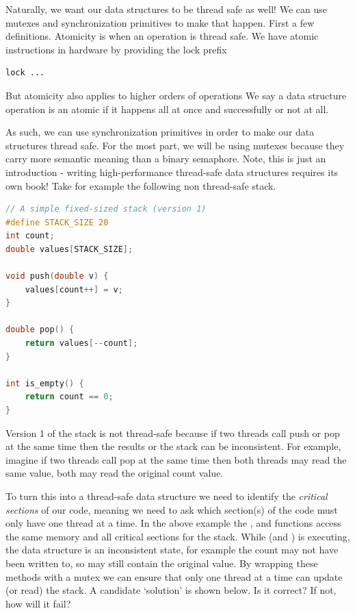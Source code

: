 Naturally, we want our data structures to be thread safe as well!
We can use mutexes and synchronization primitives to make that happen.
First a few definitions.
Atomicity is when an operation is thread safe.
We have atomic instructions in hardware by providing the lock prefix
\begin{lstlisting}
lock ...
\end{lstlisting}
But atomicity also applies to higher orders of operations
We say a data structure operation is an atomic if it happens all at once and successfully or not at all.

As such, we can use synchronization primitives in order to make our data structures thread safe.
For the most part, we will be using mutexes because they carry more semantic meaning than a binary semaphore.
Note, this is just an introduction - writing high-performance thread-safe data structures requires its own book!
Take for example the following non thread-safe stack.

\begin{lstlisting}[language=C]
// A simple fixed-sized stack (version 1)
#define STACK_SIZE 20
int count;
double values[STACK_SIZE];

void push(double v) {
    values[count++] = v;
}

double pop() {
    return values[--count];
}

int is_empty() {
    return count == 0;
}
\end{lstlisting}

Version 1 of the stack is not thread-safe because if two threads call push or pop at the same time then the results or the stack can be inconsistent.
For example, imagine if two threads call pop at the same time then both threads may read the same value, both may read the original count value.

To turn this into a thread-safe data structure we need to identify the \emph{critical sections} of our code, meaning we need to ask which section(s) of the code must only have one thread at a time.
In the above example the , and  functions access the same memory and all critical sections for the stack.
While  (and ) is executing, the data structure is an inconsistent state, for example the count may not have been written to, so may still contain the original value.
By wrapping these methods with a mutex we can ensure that only one thread at a time can update (or read) the stack.
A candidate `solution' is shown below.
Is it correct? If not, how will it fail?

